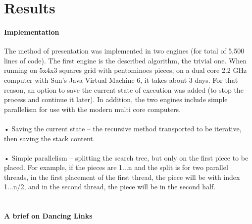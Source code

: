 \documentclass[a4paper,twoside,10pt]{report}
\begin{document}
\chapter{Results}\label{Results}

\subsubsection{Implementation}

The method of presentation was implemented in two engines (for total of 5,500 lines of code). The first engine is the described algorithm, the trivial one. When running on 5x4x3 squares grid with pentominoes pieces, on a dual core 2.2 GHz computer with Sun’s Java Virtual Machine 6, it takes about 3 days. For that reason, an option to save the current state of execution was added (to stop the process and continue it later). In addition, the two engines include simple parallelism for use with the modern multi core computers.\\
\\
•	Saving the current state – the recursive method transported to be iterative, then saving the stack content.
\\
\\•	Simple parallelism – splitting the search tree, but only on the first piece to be placed. For example, if the pieces are 1...n and the split is for two parallel threads, in the first placement of the first thread, the piece will be with index 1...n/2, and in the second thread, the piece will be in the second half.
\\\\
\subsubsection{A brief on Dancing Links}
\end{document}
